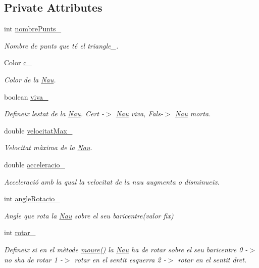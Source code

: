 \subsection*{Private Attributes}
\begin{DoxyCompactItemize}
\item 
int \hyperlink{class_nau_adaf4948df660e9cfcac14a3fb75de454}{nombre\+Punts\+\_\+}
\begin{DoxyCompactList}\small\item\em Nombre de punts que té el triangle\+\_\+. \end{DoxyCompactList}\item 
Color \hyperlink{class_nau_a5447088ba94469c8f4285650b25211fa}{c\+\_\+}
\begin{DoxyCompactList}\small\item\em Color de la \hyperlink{class_nau}{Nau}. \end{DoxyCompactList}\item 
boolean \hyperlink{class_nau_a165d7613744bb71f472d6bc56aa65540}{viva\+\_\+}
\begin{DoxyCompactList}\small\item\em Defineix l\textquotesingle{}estat de la \hyperlink{class_nau}{Nau}. Cert -\/$>$ \hyperlink{class_nau}{Nau} viva, Fals-\/$>$ \hyperlink{class_nau}{Nau} morta. \end{DoxyCompactList}\item 
double \hyperlink{class_nau_a6a18449674ed5d2317a6795bd56f7dd0}{velocitat\+Max\+\_\+}
\begin{DoxyCompactList}\small\item\em Velocitat màxima de la \hyperlink{class_nau}{Nau}. \end{DoxyCompactList}\item 
double \hyperlink{class_nau_a03ae6d8631e7668bb556e93e83dbcffd}{acceleracio\+\_\+}
\begin{DoxyCompactList}\small\item\em Acceleració amb la qual la velocitat de la nau augmenta o disminueix. \end{DoxyCompactList}\item 
int \hyperlink{class_nau_a4a3defe435bcea8864ff9025c740695a}{angle\+Rotacio\+\_\+}
\begin{DoxyCompactList}\small\item\em Angle que rota la \hyperlink{class_nau}{Nau} sobre el seu baricentre(valor fix) \end{DoxyCompactList}\item 
int \hyperlink{class_nau_a128a1860c49ef16bfd63406f4ef0db75}{rotar\+\_\+}
\begin{DoxyCompactList}\small\item\em Defineix si en el mètode \hyperlink{class_nau_a8dc46f91e02910b92bfad9b798f6552c}{moure()} la \hyperlink{class_nau}{Nau} ha de rotar sobre el seu baricentre 0 -\/$>$ no s\textquotesingle{}ha de rotar 1 -\/$>$ rotar en el sentit esquerra 2 -\/$>$ rotar en el sentit dret. \end{DoxyCompactList}\end{DoxyCompactItemize}


